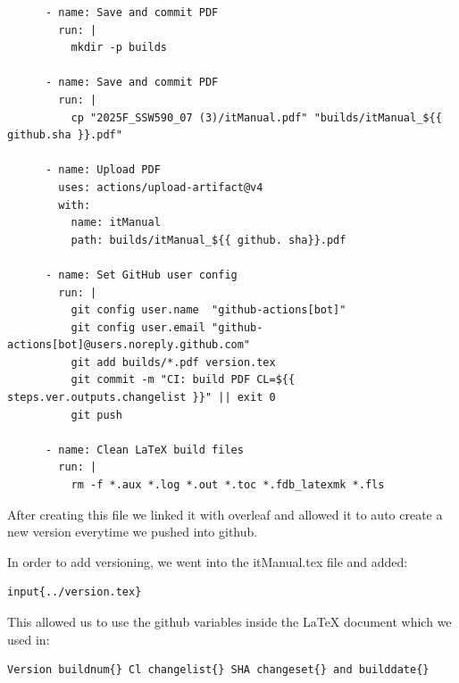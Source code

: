 \begin{verbatim}
      - name: Save and commit PDF
        run: |
          mkdir -p builds

      - name: Save and commit PDF
        run: |
          cp "2025F_SSW590_07 (3)/itManual.pdf" "builds/itManual_${{ github.sha }}.pdf"

      - name: Upload PDF
        uses: actions/upload-artifact@v4
        with:
          name: itManual
          path: builds/itManual_${{ github. sha}}.pdf

      - name: Set GitHub user config
        run: |
          git config user.name  "github-actions[bot]"
          git config user.email "github-actions[bot]@users.noreply.github.com"
          git add builds/*.pdf version.tex
          git commit -m "CI: build PDF CL=${{ steps.ver.outputs.changelist }}" || exit 0
          git push

      - name: Clean LaTeX build files
        run: |
          rm -f *.aux *.log *.out *.toc *.fdb_latexmk *.fls
\end{verbatim}


After creating this file we linked it with overleaf and allowed it to auto create a new version everytime we pushed into github. 


In order to add versioning, we went into the itManual.tex file and added:
\begin{verbatim}
input{../version.tex}
\end{verbatim}

This allowed us to use the github variables inside the LaTeX document which we used in:

\begin{verbatim}
Version buildnum{} Cl changelist{} SHA changeset{} and builddate{}
\end{verbatim}
